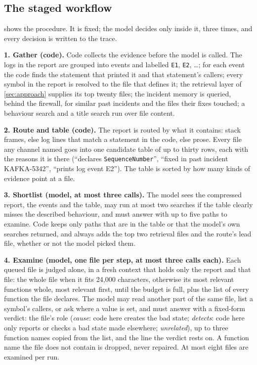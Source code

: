 \subsection{The staged workflow}
\label{sec:agent:stages}

 shows the procedure. It is fixed; the model decides
only inside it, three times, and every decision is written to the
trace.

\textbf{1. Gather (code).} Code collects the evidence before the model
is called. The logs in the report are grouped into events and labelled
\texttt{E1}, \texttt{E2}, \ldots; for each event the code finds the
statement that printed it and that statement's callers; every symbol in
the report is resolved to the file that defines it; the retrieval layer
of \cref{sec:approach} supplies its top twenty files; the incident
memory is queried, behind the firewall, for similar past incidents and
the files their fixes touched; a behaviour search and a title search run
over file content.

\textbf{2. Route and table (code).} The report is routed by what it
contains: stack frames, else log lines that match a statement in the
code, else prose. Every file any channel named goes into one candidate
table of up to thirty rows, each with the reasons it is there
(``declares \texttt{SequenceNumber}'', ``fixed in past incident
KAFKA-5342'', ``prints log event E2''). The table is sorted by how many
kinds of evidence point at a file.

\textbf{3. Shortlist (model, at most three calls).} The model sees the
compressed report, the events and the table, may run at most two
searches if the table clearly misses the described behaviour, and must
answer with up to five paths to examine. Code keeps only paths that are
in the table or that the model's own searches returned, and always adds
the top two retrieval files and the route's lead file, whether or not
the model picked them.

\textbf{4. Examine (model, one file per step, at most three calls
each).} Each queued file is judged alone, in a fresh context that holds
only the report and that file: the whole file when it fits 24{,}000
characters, otherwise its most relevant functions whole, most relevant
first, until the budget is full, plus the list of every function the
file declares. The model may read another part of the same file, list a
symbol's callers, or ask where a value is set, and must answer with a
fixed-form verdict: the file's role (\emph{cause}: code here creates
the bad state; \emph{detects}: code here only reports or checks a bad
state made elsewhere; \emph{unrelated}), up to three function names
copied from the list, and the line the verdict rests on. A function name
the file does not contain is dropped, never repaired. At most eight
files are examined per run.

